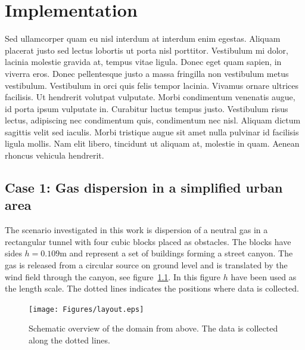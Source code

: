 
\chapter{Implementation} %

\label{implementation} %



Sed ullamcorper quam eu nisl interdum at interdum enim egestas. Aliquam placerat justo sed lectus lobortis ut porta nisl porttitor. Vestibulum mi dolor, lacinia molestie gravida at, tempus vitae ligula. Donec eget quam sapien, in viverra eros. Donec pellentesque justo a massa fringilla non vestibulum metus vestibulum. Vestibulum in orci quis felis tempor lacinia. Vivamus ornare ultrices facilisis. Ut hendrerit volutpat vulputate. Morbi condimentum venenatis augue, id porta ipsum vulputate in. Curabitur luctus tempus justo. Vestibulum risus lectus, adipiscing nec condimentum quis, condimentum nec nisl. Aliquam dictum sagittis velit sed iaculis. Morbi tristique augue sit amet nulla pulvinar id facilisis ligula mollis. Nam elit libero, tincidunt ut aliquam at, molestie in quam. Aenean rhoncus vehicula hendrerit.

\section{Case 1: Gas dispersion in a simplified urban area}

The scenario investigated in this work is dispersion of a neutral gas in a rectangular tunnel
with four cubic blocks placed as obstacles. The blocks have sides $h = 0.109$m and represent a 
set of buildings forming a street canyon. The gas is released from a circular source on 
ground level and
is translated by the wind field through the canyon, see figure~\ref{fig:layout}.
In this figure $h$ have been used as the length scale. The dotted lines
indicates the positions where data is collected.
%
\begin{figure}[h]
	\texttt{[image: Figures/layout.eps]}
	\caption{Schematic overview of the domain from above. The data is collected along the dotted lines.}
	\label{fig:layout}
\end{figure}
%

